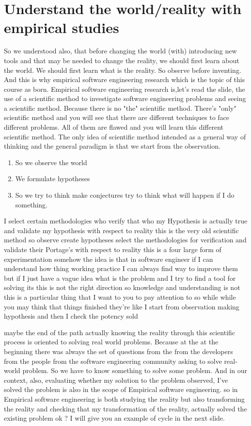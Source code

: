 \documentclass[conference, compsoc, twoside]{IEEEtran}
\begin{document}
\section{Understand the world/reality with empirical studies} %
\label{sec:understand_the_world}
 So we understood also, that before changing the world (with) introducing new tools and that may be needed to change the reality, we should first learn about the world.
 We should first learn what is the reality. So observe before inventing.
 And this is why empirical software engineering research which is the topic of this course as born.
 Empirical software engineering research is,let's read the slide, the use of a scientific method to investigate software engineering problems and seeing a scientific method.
 Because there is no "the" scientific method. 
 There's "only" scientific method and you will see that there are different techniques to face different problems.
 All of them are flawed and you will learn this different scientific method.
 The only idea of scientific method intended as a general way of thinking and the general paradigm is that we start from the observation. 
 \begin{enumerate}
 	\item So we observe the world
 	\item We formulate hypotheses
 	\item So we try to think make conjectures try to think what will happen if I do something.
 \end{enumerate}
   
 I select certain methodologies who verify that who my Hypothesis is actually true and validate my hypothesis with respect to reality this is the very old scientific method so observe create hypotheses select the methodologies for verification and validate their Portage's with respect to reality this is a four large form of experimentation somehow the idea is that in software engineer if I can understand how thing working practice I can always find way to improve them but if I just have a vague idea what is the problem and I try to find a tool for solving its this is not the right direction so knowledge and understanding is not this is a particular thing that I want to you to pay attention to so while while you may think that things finished they're like I start from observation making hypothesis and then I check the potency sold 

 maybe the end of the path actually knowing the reality through this scientific process is oriented to solving real world problems.
 Because at the at the beginning there was always the set of questions from the from the developers from the people from the software engineering community asking to solve real-world problem.
 So we have to know something to solve some problem.
 And in our context, also, evaluating whether my solution to the problem observed, I've solved the problem is also in the scope of Empirical software engineering.
 so in Empirical software engineering is both studying the reality but also transforming the reality and checking that my transformation of the reality, actually solved the existing problem ok ? 
 I will give you an example of cycle in the next slide. 
\end{document}
